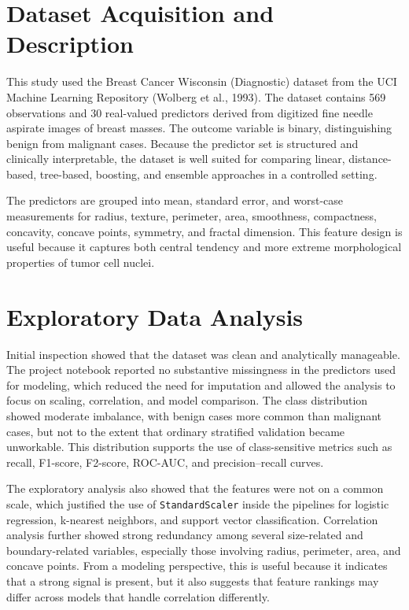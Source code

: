 \documentclass[conference]{IEEEtran}
\begin{document}
\section{Dataset Acquisition and Description}
This study used the Breast Cancer Wisconsin (Diagnostic) dataset from the UCI Machine Learning Repository (Wolberg et al., 1993). The dataset contains 569 observations and 30 real-valued predictors derived from digitized fine needle aspirate images of breast masses. The outcome variable is binary, distinguishing benign from malignant cases. Because the predictor set is structured and clinically interpretable, the dataset is well suited for comparing linear, distance-based, tree-based, boosting, and ensemble approaches in a controlled setting.

The predictors are grouped into mean, standard error, and worst-case measurements for radius, texture, perimeter, area, smoothness, compactness, concavity, concave points, symmetry, and fractal dimension. This feature design is useful because it captures both central tendency and more extreme morphological properties of tumor cell nuclei.


\section{Exploratory Data Analysis}
Initial inspection showed that the dataset was clean and analytically manageable. The project notebook reported no substantive missingness in the predictors used for modeling, which reduced the need for imputation and allowed the analysis to focus on scaling, correlation, and model comparison. The class distribution showed moderate imbalance, with benign cases more common than malignant cases, but not to the extent that ordinary stratified validation became unworkable. This distribution supports the use of class-sensitive metrics such as recall, F1-score, F2-score, ROC-AUC, and precision--recall curves.

The exploratory analysis also showed that the features were not on a common scale, which justified the use of \texttt{StandardScaler} inside the pipelines for logistic regression, k-nearest neighbors, and support vector classification. Correlation analysis further showed strong redundancy among several size-related and boundary-related variables, especially those involving radius, perimeter, area, and concave points. From a modeling perspective, this is useful because it indicates that a strong signal is present, but it also suggests that feature rankings may differ across models that handle correlation differently.
\end{document}
